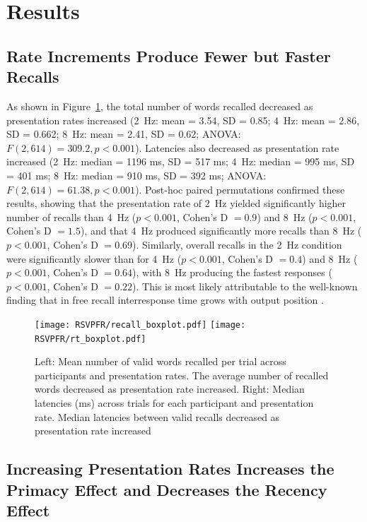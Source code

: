 \documentclass[10pt,letterpaper]{article}
\begin{document}
\section{Results}

\subsection{Rate Increments Produce Fewer but Faster Recalls}

As shown in Figure~\ref{Descriptives}, the total number of words recalled
decreased as presentation rates increased (2~Hz: mean = 3.54, SD = 0.85; 4~Hz:
mean = 2.86, SD = 0.662; 8~Hz: mean = 2.41, SD = 0.62; ANOVA: $F(2, 614) =
309.2, p < 0.001$). Latencies also decreased as presentation rate increased 
(2~Hz: median = 1196 ms, SD = 517 ms; 4~Hz: median = 995 ms, SD = 401 ms; 8~Hz:
median = 910 ms, SD = 392 ms; ANOVA: $F(2, 614) = 61.38, p < 0.001$). Post-hoc
paired permutations confirmed these results, showing that the presentation
rate of 2~Hz yielded significantly higher number of recalls than 4~Hz ($p <
0.001$, Cohen's D $= 0.9$) and 8~Hz ($p < 0.001$, Cohen's D $= 1.5$), and that
4~Hz produced significantly more recalls than 8~Hz ($p < 0.001$, Cohen's D $=
0.69$). Similarly, overall recalls in the 2~Hz condition were significantly
slower than for 4~Hz ($p < 0.001$, Cohen's D $= 0.4$) and 8~Hz ($p < 0.001$,
Cohen's D $= 0.64$), with 8~Hz producing the fastest responses ($p < 0.001$,
Cohen's D $= 0.22$).   This is most likely attributable to the well-known
finding that in free recall interresponse time grows with output position
\cite{MurdOkad70}.

\begin{figure}
\begin{center}
\texttt{[image: RSVPFR/recall\_boxplot.pdf]}
\texttt{[image: RSVPFR/rt\_boxplot.pdf]}
\end{center}
\caption{Left: Mean number of valid words recalled per trial across participants and presentation rates. The average number of recalled words decreased as presentation rate increased. Right: Median latencies (ms) across trials for each participant and presentation rate. Median latencies between valid recalls decreased as presentation rate increased} 
\label{Descriptives}
\end{figure}

\subsection{Increasing Presentation Rates Increases the Primacy Effect and Decreases the Recency Effect}
\end{document}
